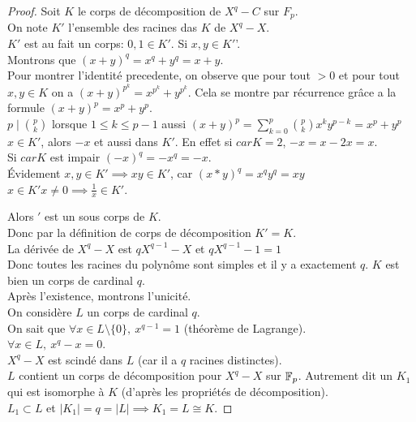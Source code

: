 \begin{proof}
	Soit $K$ le corps de décomposition de $X^q-C$ sur $F_p$. \\
	On note $K'$ l'ensemble des racines das $K$ de $X^q-X$. \\
	$K'$ est au fait un corps: $0, 1 \in K'$. Si $x, y \in K'$'.\\
	Montrons que $(x+y)^q = x^q + y^q = x+ y$.\\
	Pour montrer l'identité precedente, on observe que pour tout $>0$ et pour tout $x,y \in K$ on a
	$(x+y)^{p^k}= x^{p^k} + y^{p^k}$. Cela se montre par récurrence grâce a la formule $(x+y)^p= x^p + y^p$.\\
	$p \mid \binom{p}{k}$ lorsque $1 \leq k \leq p-1$ aussi $(x+y)^p = \sum^p_{k=0} \binom{p}{k} x^k y^{p-k} = x^p + y^p$\\

	$x\in K'$, alors $-x$ et aussi dans $K'$.
	En effet si $car K = 2$, $-x = x -2x = x$. \\
	Si $car K$ est impair $(-x)^q = -x^q = -x$. \\
	Évidement $x,y \in K' \implies xy \in K'$, car $(x*y)^q = x^qy^q = xy$\\
	$x\in K' x \neq 0 \implies \frac{1}{x} \in K'$.

	Alors $'$ est un sous corps de $K$.\\
	Donc par la définition de corps de décomposition $K' = K$.\\

	La dérivée de $X^q-X$ est $qX^{q-1} - X$ et $qX^{q-1} - 1 = 1$\\
	Donc toutes les racines du polynôme sont simples et il y a exactement $q$. $K$ est bien un corps de cardinal $q$.\\



	Après l'existence, montrons l'unicité.\\

	On considère $L$ un corps de cardinal $q$.\\
	On sait que $\forall x \in L \setminus \{0\},\  x^{q-1} = 1$ (théorème de Lagrange).\\ %
	$\forall x \in L, \ x^q -x = 0$.\\
	$X^q-X$ est scindé dans $L$ (car il a $q$ racines distinctes).\\ %
	$L$ contient un corps de décomposition pour $X^q-X$ sur $\mathbb{F}_p$. Autrement dit un $K_1$ qui est
	isomorphe à $K$ (d'après les propriétés de décomposition).\\
	$L_1 \subset L$ et $|K_1| = q = |L| \implies K_1 = L \cong K$.
\end{proof}

